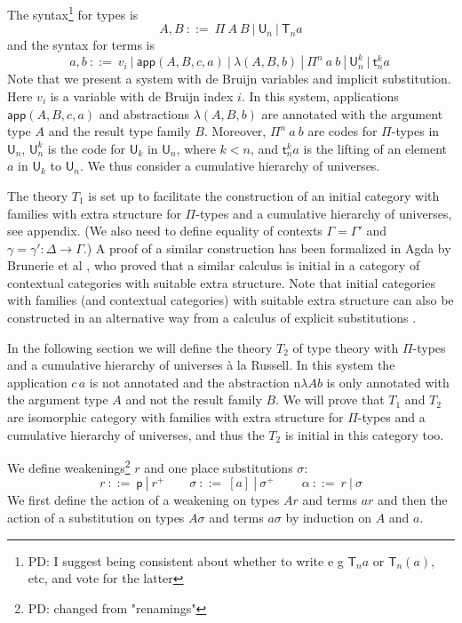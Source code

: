 \documentclass[11pt,a4paper]{article}
\theoremstyle{definition}
\def\UU{\mathsf{U}}
\newcommand{\LAM}{\lambda}
\newcommand{\APP}{\mathsf{app}}
\newcommand{\T}{\mathsf{T}}
\newcommand{\sT}{\mathsf{t}}
\newcommand{\pp}{\mathsf{p}}
\begin{document}
The syntax\footnote{PD: I suggest being consistent about whether to write e g $\T_n a$ or $\T_n(a)$, etc, and vote for the latter} for types is
$$
A,B~::=~\Pi~{A}~B~|~\UU_n~|~\T_n a
$$
and the syntax for terms is
$$
a,b~::=~v_i~|~\APP(A,B,c,a)~|~\LAM(A,B,b)~|~\Pi^n~ a~b~|~\UU^k_n~|~\sT^k_n a~
$$
Note that we present a system with de Bruijn variables and implicit substitution.
Here $v_i$ is a variable with de Bruijn index $i$. In this system, applications $\APP(A,B,c,a)$ and abstractions $\LAM(A,B,b)$ are annotated with the argument type $A$ and the result type family $B$. Moreover, $\Pi^n~ a~b$ are codes for $\Pi$-types in $\UU_n$, $\UU^k_n$ is the code for $\UU_k$ in $\UU_n$, where $k < n$, and $\sT^k_n a$ is the lifting of an element $a$ in $\UU_k$ to $\UU_n$. We thus consider a cumulative hierarchy of universes.

The theory $T_1$ is set up to facilitate the construction of an initial category with families with extra structure for $\Pi$-types and a cumulative hierarchy of universes, see appendix. (We also need to define equality of contexts $\Gamma = \Gamma'$ and $\gamma = \gamma' : \Delta \to \Gamma$.) A proof of a similar construction has been formalized in Agda by Brunerie et al \cite{brunerie:initial}, who proved that a similar calculus is initial in a category of contextual categories with suitable extra structure. Note that initial categories with families (and contextual categories) with suitable extra structure can also be constructed in an alternative way from a calculus of explicit substitutions  \cite{casellan:tlca15}.

In the following section we will define the theory $T_2$ of type theory with $\Pi$-types and a cumulative hierarchy of universes \`a la Russell. In this system the application $c\,a$ is not annotated and the abstraction n$\lambda A b$ is only annotated with the argument type $A$ and not the result family $B$. We will prove that $T_1$ and $T_2$ are isomorphic 
category with families with extra structure for $\Pi$-types and a cumulative hierarchy of universes, and thus the $T_2$ is initial in this category too.
\medskip

We define weakenings\footnote{PD: changed from "renamings"} $r$ and one place substitutions $\sigma$:
$$
r~::=~\pp~|~r^+~~~~~~~~~\sigma~::=~[a]~|~\sigma^+~~~~~~~~~~\alpha~::=~r~|~\sigma
$$
We first define the action of a weakening on types $Ar$ and terms $ar$ and then the action of a substitution on types $A\sigma$ and terms $a\sigma$ by induction on $A$ and $a$. 
\end{document}
